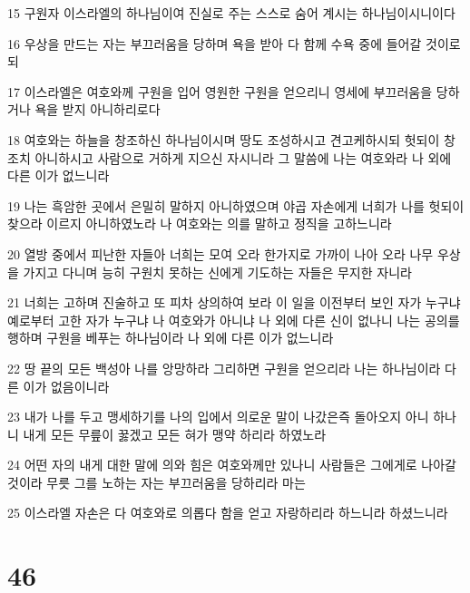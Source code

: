 \par 15 구원자 이스라엘의 하나님이여 진실로 주는 스스로 숨어 계시는 하나님이시니이다
\par 16 우상을 만드는 자는 부끄러움을 당하며 욕을 받아 다 함께 수욕 중에 들어갈 것이로되
\par 17 이스라엘은 여호와께 구원을 입어 영원한 구원을 얻으리니 영세에 부끄러움을 당하거나 욕을 받지 아니하리로다
\par 18 여호와는 하늘을 창조하신 하나님이시며 땅도 조성하시고 견고케하시되 헛되이 창조치 아니하시고 사람으로 거하게 지으신 자시니라 그 말씀에 나는 여호와라 나 외에 다른 이가 없느니라
\par 19 나는 흑암한 곳에서 은밀히 말하지 아니하였으며 야곱 자손에게 너희가 나를 헛되이 찾으라 이르지 아니하였노라 나 여호와는 의를 말하고 정직을 고하느니라
\par 20 열방 중에서 피난한 자들아 너희는 모여 오라 한가지로 가까이 나아 오라 나무 우상을 가지고 다니며 능히 구원치 못하는 신에게 기도하는 자들은 무지한 자니라
\par 21 너희는 고하며 진술하고 또 피차 상의하여 보라 이 일을 이전부터 보인 자가 누구냐 예로부터 고한 자가 누구냐 나 여호와가 아니냐 나 외에 다른 신이 없나니 나는 공의를 행하며 구원을 베푸는 하나님이라 나 외에 다른 이가 없느니라
\par 22 땅 끝의 모든 백성아 나를 앙망하라 그리하면 구원을 얻으리라 나는 하나님이라 다른 이가 없음이니라
\par 23 내가 나를 두고 맹세하기를 나의 입에서 의로운 말이 나갔은즉 돌아오지 아니 하나니 내게 모든 무릎이 꿇겠고 모든 혀가 맹약 하리라 하였노라
\par 24 어떤 자의 내게 대한 말에 의와 힘은 여호와께만 있나니 사람들은 그에게로 나아갈 것이라 무릇 그를 노하는 자는 부끄러움을 당하리라 마는
\par 25 이스라엘 자손은 다 여호와로 의롭다 함을 얻고 자랑하리라 하느니라 하셨느니라

\chapter{46}

